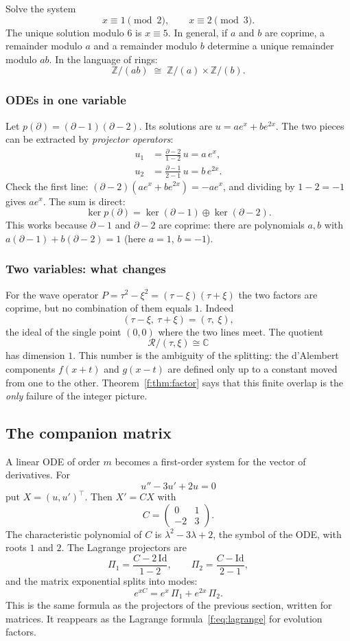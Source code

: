 \documentclass[11pt]{article}
\theoremstyle{plain}
\theoremstyle{definition}
\theoremstyle{remark}
\newcommand{\C}{\mathbb{C}}
\newcommand{\Z}{\mathbb{Z}}
\newcommand{\ring}{\mathcal{R}}            %
\newcommand{\Id}{\mathrm{Id}}
\begin{document}
Solve the system
\[
x\equiv1\pmod 2,\qquad x\equiv2\pmod 3 .
\]
The unique solution modulo $6$ is $x\equiv5$. In general, if $a$ and $b$ are coprime, a remainder modulo $a$ and a remainder modulo $b$ determine a unique remainder modulo $ab$. In the language of rings:
\[
\Z/(ab)\;\cong\;\Z/(a)\times\Z/(b).
\]

\subsubsection{ODEs in one variable}

Let $p(\partial)=(\partial-1)(\partial-2)$. Its solutions are $u=ae^x+be^{2x}$. The two pieces can be extracted by \emph{projector operators}:
\begin{align*}
u_1&=\frac{\partial-2}{1-2}\,u=a\,e^{x},\\[3pt]
u_2&=\frac{\partial-1}{2-1}\,u=b\,e^{2x}.
\end{align*}
Check the first line: $(\partial-2)(ae^x+be^{2x})=-ae^x$, and dividing by $1-2=-1$ gives $ae^x$. The sum is direct:
\[
\ker p(\partial)=\ker(\partial-1)\oplus\ker(\partial-2).
\]
This works because $\partial-1$ and $\partial-2$ are coprime: there are polynomials $a,b$ with $a(\partial-1)+b(\partial-2)=1$ (here $a=1$, $b=-1$).

\subsubsection{Two variables: what changes}

For the wave operator $P=\tau^2-\xi^2=(\tau-\xi)(\tau+\xi)$ the two factors are coprime, but no combination of them equals $1$. Indeed
\[
(\tau-\xi,\ \tau+\xi)=(\tau,\ \xi),
\]
the ideal of the single point $(0,0)$ where the two lines meet. The quotient
\[
\ring/(\tau,\xi)\cong\C
\]
has dimension $1$. This number is the ambiguity of the splitting: the d'Alembert components $f(x+t)$ and $g(x-t)$ are defined only up to a constant moved from one to the other. Theorem~\ref{f:thm:factor} says that this finite overlap is the \emph{only} failure of the integer picture.

\subsection{The companion matrix}\label{sec:pr-comp}

A linear ODE of order $m$ becomes a first-order system for the vector of derivatives. For
\[
u''-3u'+2u=0
\]
put $X=(u,u')^{\top}$. Then $X'=CX$ with
\[
C=\begin{pmatrix}0&1\\-2&3\end{pmatrix}.
\]
The characteristic polynomial of $C$ is $\lambda^2-3\lambda+2$, the symbol of the ODE, with roots $1$ and $2$. The Lagrange projectors are
\[
\Pi_1=\frac{C-2\,\Id}{1-2},\qquad \Pi_2=\frac{C-\Id}{2-1},
\]
and the matrix exponential splits into modes:
\[
e^{xC}=e^{x}\,\Pi_1+e^{2x}\,\Pi_2 .
\]
This is the same formula as the projectors of the previous section, written for matrices. It reappears as the Lagrange formula~\eqref{f:eq:lagrange} for evolution factors.
\end{document}
